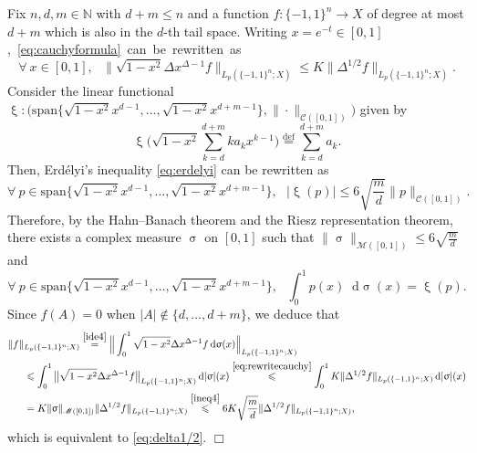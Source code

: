 \documentclass[11pt,reqno]{amsart}
\renewcommand{\leq}{\leqslant}
\newcommand{\1}{\mathbf 1}
\theoremstyle{remark}
\renewcommand{\xi}{\upxi}
\newcommand{\N}{\mathbb N}
\newcommand{\eqdef}{\stackrel{\mathrm{def}}{=}}
\renewcommand{\sigma}{\upsigma}
\newcommand*\diff{\mathop{}\!\mathrm{d}}
\newcommand{\ms}{\mathscr}
\begin{document}
Fix $n,d,m\in\N$ with $d+m\leq n$ and a function $f:\{-1,1\}^n\to X$ of degree at most $d+m$ which is also in the $d$-th tail space. Writing $x=e^{-t}\in[0,1]$,\mbox{ \eqref{eq:cauchyformula} can be rewritten as}
\begin{equation} \label{eq:rewritecauchy}
\forall \ x\in[0,1], \ \ \ \|\sqrt{1-x^2}\Delta x^{\Delta-1}f\|_{L_p(\{-1,1\}^n;X)} \leq K \|\Delta^{1/2}f\|_{L_p(\{-1,1\}^n;X)}.
\end{equation}
Consider the linear functional $\xi:\big(\mathrm{span}\big\{\sqrt{1-x^2}x^{d-1},\ldots,\sqrt{1-x^2}x^{d+m-1}\big\},\|\cdot\|_{\ms{C}([0,1])}\big)$ given by
\begin{equation}
\xi\Big(  \sqrt{1-x^2} \sum_{k=d}^{d+m} k a_k x^{k-1}\Big) \eqdef \sum_{k=d}^{d+m} a_k.
\end{equation}
Then, Erd\'elyi's inequality \eqref{eq:erdelyi} can be rewritten as
\begin{equation} \label{ineq4}
\forall \ p\in\mathrm{span}\big\{\sqrt{1-x^2}x^{d-1},\ldots,\sqrt{1-x^2}x^{d+m-1}\big\},  \ \ \ |\xi(p)| \leq 6\sqrt{\frac{m}{d}} \|p\|_{\ms{C}([0,1])}.
\end{equation}
Therefore, by the Hahn--Banach theorem and the Riesz representation theorem, there exists a complex measure $\sigma$ on $[0,1]$ such that $\|\sigma\|_{\ms{M}([0,1])}\leq 6\sqrt{\frac{m}{d}}$ and
\begin{equation} \label{ide4}
\forall \ p\in\mathrm{span}\big\{\sqrt{1-x^2}x^{d-1},\ldots,\sqrt{1-x^2}x^{d+m-1}\big\},  \ \ \ \int_0^1 p(x)\diff\sigma(x) = \xi(p).
\end{equation}
Since $\widehat{f}(A)=0$ when $|A|\notin\{d,\ldots,d+m\}$, we deduce that
\begin{equation}
\begin{split}
\|f\|&_{L_p(\{-1,1\}^n;X)} \stackrel{\eqref{ide4}}{=} \Big\| \int_0^1 \sqrt{1-x^2} \Delta x^{\Delta-1} f\diff\sigma(x)\Big\|_{L_p(\{-1,1\}^n;X)} 
\\ & \leq \int_0^1 \big\|\sqrt{1-x^2} \Delta x^{\Delta-1} f\big\|_{L_p(\{-1,1\}^n;X)}\diff|\sigma|(x) \stackrel{\eqref{eq:rewritecauchy}}{\leq} \int_0^1 K\|\Delta^{1/2}f\|_{L_p(\{-1,1\}^n;X)} \diff|\sigma|(x)
\\ & = K\|\sigma\|_{\ms{M}([0,1])} \|\Delta^{1/2}f\|_{L_p(\{-1,1\}^n;X)} \stackrel{\eqref{ineq4}}{\leq} 6K\sqrt{\frac{m}{d}} \|\Delta^{1/2}f\|_{L_p(\{-1,1\}^n;X)},
\end{split}
\end{equation}
which is equivalent to \eqref{eq:delta1/2}.
\hfill$\Box$
\end{document}
